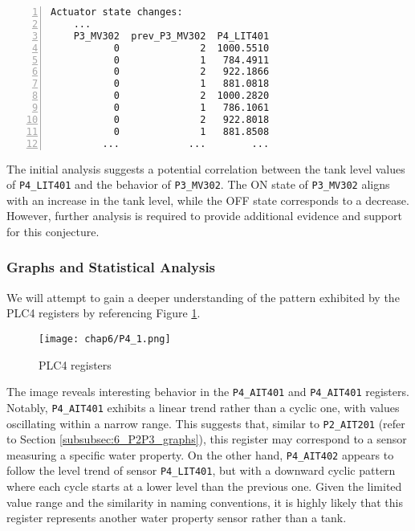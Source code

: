 \begin{lstlisting}[language=bash, numbers=left, caption=\texttt{P3\_MV302} state changes in relation to \texttt{P4\_LIT401}, label=lst:6_P3P4_preproc_changestate]
	Actuator state changes:
	...
	P3_MV302  prev_P3_MV302  P4_LIT401
	       0              2  1000.5510
	       0              1   784.4911
	       0              2   922.1866
	       0              1   881.0818
	       0              2  1000.2820
	       0              1   786.1061
	       0              2   922.8018
	       0              1   881.8508
	     ...            ...        ...
\end{lstlisting}

The initial analysis suggests a potential correlation between the tank level values of \texttt{P4\_LIT401} and the behavior of \texttt{P3\_MV302}. The ON state of \texttt{P3\_MV302} aligns with an increase in the tank level, while the OFF state corresponds to a decrease. However, further analysis is required to provide additional evidence and support for this conjecture.

\subsubsection{Graphs and Statistical Analysis}
\label{subsubsec:6_P3P4_graphs}
We will attempt to gain a deeper understanding of the pattern exhibited by the PLC4 registers by referencing Figure \ref{fig:6_graph_P4}.

\begin{figure}[ht]
	\centering
	\texttt{[image: chap6/P4\_1.png]}
	\caption{PLC4 registers}
	\label{fig:6_graph_P4}
\end{figure}

The image reveals interesting behavior in the \texttt{P4\_AIT401} and \texttt{P4\_AIT401} registers. Notably, \texttt{P4\_AIT401} exhibits a linear trend rather than a cyclic one, with values oscillating within a narrow range. This suggests that, similar to \texttt{P2\_AIT201} (refer to Section \ref{subsubsec:6_P2P3_graphs}), this register may correspond to a sensor measuring a specific water property. On the other hand, \texttt{P4\_AIT402} appears to follow the level trend of sensor \texttt{P4\_LIT401}, but with a downward cyclic pattern where each cycle starts at a lower level than the previous one. Given the limited value range and the similarity in naming conventions, it is highly likely that this register represents another water property sensor rather than a tank.

